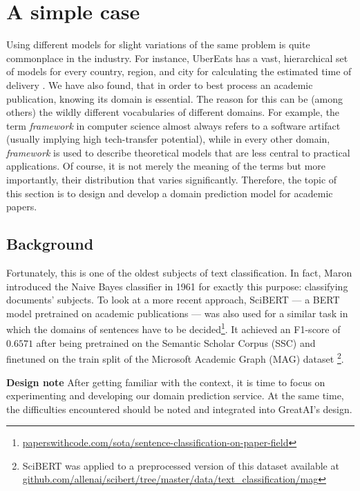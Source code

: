 \section{A simple case} \label{section:simple-case}

Using different models for slight variations of the same problem is quite commonplace in the industry. For instance, UberEats has a vast, hierarchical set of models for every country, region, and city for calculating the estimated time of delivery \cite{li2017scaling}. We have also found, that in order to best process an academic publication, knowing its domain is essential. The reason for this can be (among others) the wildly different vocabularies of different domains. For example, the term \textit{framework} in computer science almost always refers to a software artifact (usually implying high tech-transfer potential), while in every other domain, \textit{framework} is used to describe theoretical models that are less central to practical applications. Of course, it is not merely the meaning of the terms but more importantly, their distribution that varies significantly. Therefore, the topic of this section is to design and develop a domain prediction model for academic papers.

\subsection{Background}

Fortunately, this is one of the oldest subjects of text classification. In fact, Maron introduced the Naive Bayes classifier in 1961 for exactly this purpose: classifying documents' subjects. To look at a more recent approach, SciBERT \cite{beltagy2019scibert} --- a BERT \cite{devlin2018bert} model pretrained on academic publications --- was also used for a similar task in which the domains of sentences have to be decided\footnote{\href{https://paperswithcode.com/sota/sentence-classification-on-paper-field}{paperswithcode.com/sota/sentence-classification-on-paper-field}}. It achieved an F1-score of $0.6571$ after being pretrained on the Semantic Scholar Corpus (SSC) \cite{Lo2020S2ORCTS} and finetuned on the train split of the Microsoft Academic Graph (MAG) dataset \cite{wang2019review}\footnote{SciBERT was applied to a preprocessed version of this dataset available at \href{https://github.com/allenai/scibert/tree/master/data/text_classification/mag}{github.com/allenai/scibert/tree/master/data/text\_classification/mag}}.

\begin{displayquote}
\textbf{Design note} After getting familiar with the context, it is time to focus on experimenting and developing our domain prediction service. At the same time, the difficulties encountered should be noted and integrated into GreatAI's design.
\end{displayquote}

